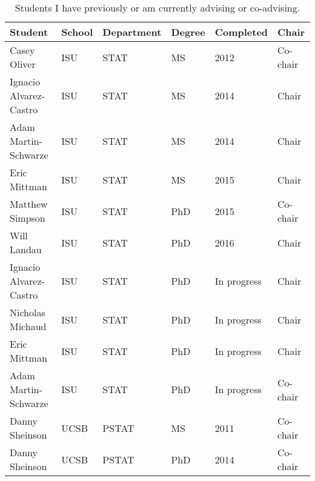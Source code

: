 \begin{table}[h]
\centering
\begin{tabular}{llllll}
  \hline
Student & School & Department & Degree & Completed & Chair \\ 
  \hline
Casey Oliver & ISU & STAT & MS & 2012 & Co-chair \\ 
  Ignacio Alvarez-Castro & ISU & STAT & MS & 2014 & Chair \\ 
  Adam Martin-Schwarze & ISU & STAT & MS & 2014 & Chair \\ 
  Eric Mittman & ISU & STAT & MS & 2015 & Chair \\ 
  Matthew Simpson & ISU & STAT & PhD & 2015 & Co-chair \\ 
  Will Landau & ISU & STAT & PhD & 2016 & Chair \\ 
  Ignacio Alvarez-Castro & ISU & STAT & PhD & In progress & Chair \\ 
  Nicholas Michaud & ISU & STAT & PhD & In progress & Chair \\ 
  Eric Mittman & ISU & STAT & PhD & In progress & Chair \\ 
  Adam Martin-Schwarze & ISU & STAT & PhD & In progress & Co-chair \\ 
  Danny Sheinson & UCSB & PSTAT & MS & 2011 & Co-chair \\ 
  Danny Sheinson & UCSB & PSTAT & PhD & 2014 & Co-chair \\ 
   \hline
\end{tabular}
\caption{Students I have previously or am currently advising or co-advising.} 
\label{tab:advisees}
\end{table}
